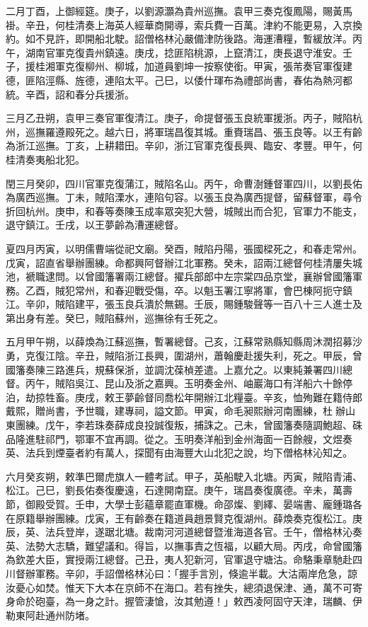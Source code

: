 \begin{pinyinscope}
二月丁酉，上御經筵。庚子，以劉源灝為貴州巡撫。袁甲三奏克復鳳陽，賜黃馬褂。辛丑，何桂清奏上海英人經華商開導，索兵費一百萬。津約不能更易，入京換約。如不見許，即開船北駛。詔僧格林沁嚴備津防後路。海運漕糧，暫緩放洋。丙午，湖南官軍克復貴州鎮遠。庚戌，捻匪陷桃源，上竄清江，庚長退守淮安。壬子，援桂湘軍克復柳州、柳城，加道員劉坤一按察使銜。甲寅，張芾奏官軍復建德，匪陷涇縣、旌德，連陷太平。己巳，以倭什琿布為禮部尚書，春佑為熱河都統。辛酉，詔和春分兵援浙。

三月乙丑朔，袁甲三奏官軍復清江。庚子，命提督張玉良統軍援浙。丙子，賊陷杭州，巡撫羅遵殿死之。越六日，將軍瑞昌復其城。重賚瑞昌、張玉良等。以王有齡為浙江巡撫。丁亥，上耕耤田。辛卯，浙江官軍克復長興、臨安、孝豐。甲午，何桂清奏夷船北犯。

閏三月癸卯，四川官軍克復蒲江，賊陷名山。丙午，命曹澍鍾督軍四川，以劉長佑為廣西巡撫。丁未，賊陷溧水，連陷句容。以張玉良為廣西提督，留蘇督軍，尋令折回杭州。庚申，和春等奏陳玉成率眾突犯大營，城賊出而合犯，官軍力不能支，退守鎮江。壬戌，以王夢齡為漕運總督。

夏四月丙寅，以明儒曹端從祀文廟。癸酉，賊陷丹陽，張國樑死之，和春走常州。戊寅，詔直省舉辦團練。命都興阿督辦江北軍務。癸未，詔兩江總督何桂清屢失城池，褫職逮問。以曾國籓署兩江總督。擢兵部郎中左宗棠四品京堂，襄辦曾國籓軍務。乙酉，賊犯常州，和春迎戰受傷，卒。以魁玉署江寧將軍，會巴棟阿扼守鎮江。辛卯，賊陷建平，張玉良兵潰於無錫。壬辰，賜鍾駿聲等一百八十三人進士及第出身有差。癸巳，賊陷蘇州，巡撫徐有壬死之。

五月甲午朔，以薛煥為江蘇巡撫，暫署總督。己亥，江蘇常熟縣知縣周沐潤招募沙勇，克復江陰。辛丑，賊陷浙江長興，圍湖州，蕭翰慶赴援失利，死之。甲辰，曾國籓奏陳三路進兵，規蘇保浙，並調沈葆楨差遣。上嘉允之。以東純兼署四川總督。丙午，賊陷吳江、昆山及浙之嘉興。玉明奏金州、岫巖海口有洋船六十餘停泊，劫掠牲畜。庚戌，敕王夢齡督同喬松年開辦江北糧臺。辛亥，恤殉難在籍侍郎戴熙，贈尚書，予世職，建專祠，謚文節。甲寅，命毛昶熙辦河南團練，杜辦山東團練。戊午，李若珠奏薛成良投誠復叛，捕誅之。己未，曾國籓奏隨調鮑超、硃品隆進駐祁門，鄂軍不宜再調。從之。玉明奏洋船到金州海面一百餘艘，文煜奏英、法兵到煙臺者約有萬人，探聞有由海豐大山北犯之說，均下僧格林沁知之。

六月癸亥朔，敕準巴爾虎旗人一體考試。甲子，英船駛入北塘。丙寅，賊陷青浦、松江。己巳，劉長佑奏復慶遠，石達開南竄。庚午，瑞昌奏復廣德。辛未，萬壽節，御殿受賀。壬申，大學士彭蘊章罷直軍機。命邵燦、劉繹、晏端書、龐鍾璐各在原籍舉辦團練。戊寅，王有齡奏在籍道員趙景賢克復湖州。薛煥奏克復松江。庚辰，英、法兵登岸，遂踞北塘。裁南河河道總督暨淮海道各官。壬午，僧格林沁奏英、法勢大志驕，難望議和。得旨，以撫事責之恆福，以顧大局。丙戌，命曾國籓為欽差大臣，實授兩江總督。己丑，夷人犯新河，官軍退守塘沽。命駱秉章馳赴四川督辦軍務。辛卯，手詔僧格林沁曰：「握手言別，倏逾半載。大沽兩岸危急，諒汝憂心如焚。惟天下大本在京師不在海口。若有挫失，總須退保津、通，萬不可寄身命於砲臺，為一身之計。握管淒愴，汝其勉遵！」敕西凌阿固守天津，瑞麟、伊勒東阿赴通州防堵。


\end{pinyinscope}
